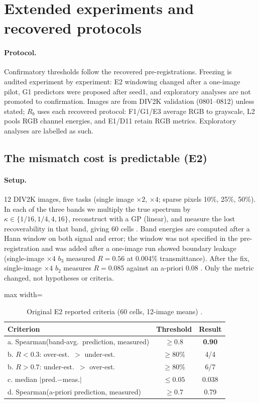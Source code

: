 \section{Extended experiments and recovered protocols}\label{app:extended}

\paragraph{Protocol.} Confirmatory thresholds follow the recovered pre-registrations. Freezing is audited experiment by experiment: E2 windowing changed after a one-image pilot, G1 predictors were proposed after seed1, and exploratory analyses are not promoted to confirmation. Images are from
DIV2K validation (0801--0812) unless stated; $R_b$ uses each recovered protocol: F1/G1/E3 average RGB to grayscale, L2 pools RGB channel energies, and E1/D11 retain RGB metrics.
Exploratory analyses are labelled as such.

\subsection{The mismatch cost is predictable (E2)}\label{sec:exp-e2}

\paragraph{Setup.} 12 DIV2K images, five tasks (single image $\times2$,
$\times4$; sparse pixels 10\%, 25\%, 50\%). In each of the three bands we
multiply the true spectrum by $\kappa\in\{1/16,1/4,4,16\}$, reconstruct with a
GP (linear), and measure the lost recoverability in that band, giving 60
cells . Band energies are computed after a Hann window on
both signal and error; the window was not specified in the pre-registration
and was added after a one-image run showed boundary leakage (single-image
$\times4$ $b_3$ measured $R=0.56$ at 0.004\% transmittance). After the fix,
single-image $\times4$ $b_2$ measures $R=0.085$ against an a-priori 0.08
. Only the metric changed, not hypotheses or criteria.

\begin{table}[t]\centering\small
\caption{Original E2 reported criteria (60 cells, 12-image means)
.}\label{tab:e2}
\begin{adjustbox}{max width=\linewidth}\begin{tabular}{lcc}\toprule
Criterion & Threshold & Result\\\midrule
a. Spearman(band-avg.\ prediction, measured) & $\ge0.8$ & \textbf{0.90}\\
b. $R<0.3$: over-est.\ $>$ under-est. & $\ge80\%$ & 4/4\\
b. $R>0.7$: under-est.\ $>$ over-est. & $\ge80\%$ & 6/7\\
c. median $|$pred.$-$meas.$|$ & $\le0.05$ & 0.038\\
d. Spearman(a-priori prediction, measured) & $\ge0.7$ & 0.79\\
\bottomrule\end{tabular}\end{adjustbox}
\end{table}


